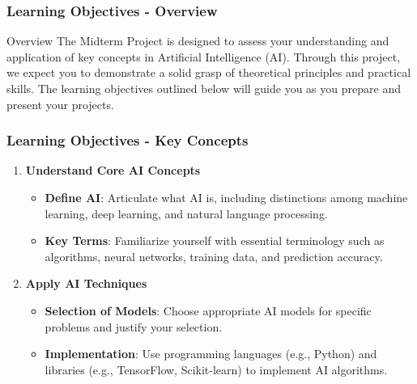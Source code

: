 \documentclass{beamer}
\begin{document}
\begin{frame}[fragile]
    \frametitle{Learning Objectives - Overview}
    \begin{block}{Overview}
        The Midterm Project is designed to assess your understanding and application of key concepts in Artificial Intelligence (AI). 
        Through this project, we expect you to demonstrate a solid grasp of theoretical principles and practical skills. 
        The learning objectives outlined below will guide you as you prepare and present your projects.
    \end{block}
\end{frame}

\begin{frame}[fragile]
    \frametitle{Learning Objectives - Key Concepts}
    \begin{enumerate}
        \item \textbf{Understand Core AI Concepts}
        \begin{itemize}
            \item \textbf{Define AI}: Articulate what AI is, including distinctions among machine learning, deep learning, and natural language processing.
            \item \textbf{Key Terms}: Familiarize yourself with essential terminology such as algorithms, neural networks, training data, and prediction accuracy.
        \end{itemize}
        \item \textbf{Apply AI Techniques}
        \begin{itemize}
            \item \textbf{Selection of Models}: Choose appropriate AI models for specific problems and justify your selection.
            \item \textbf{Implementation}: Use programming languages (e.g., Python) and libraries (e.g., TensorFlow, Scikit-learn) to implement AI algorithms.
        \end{itemize}
    \end{enumerate}
\end{frame}
\end{document}
